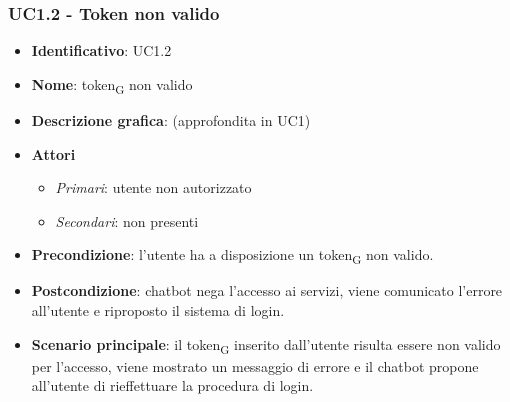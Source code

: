 \subsubsection{UC1.2 - Token non valido}
\begin{itemize}
    \item \textbf{Identificativo}: UC1.2
    \item \textbf{Nome}: token\textsubscript{G} non valido
    \item \textbf{Descrizione grafica}: (approfondita in UC1)
    \item \textbf{Attori}
 \begin{itemize} 
    \item \textit{Primari}: utente non autorizzato 
    \item \textit{Secondari}: non presenti
 \end{itemize}
 \item \textbf{Precondizione}: l'utente ha a disposizione un token\textsubscript{G} non valido.
 \item \textbf{Postcondizione}: chatbot nega l'accesso ai servizi, viene comunicato l'errore all'utente e riproposto il sistema di login.
 \item \textbf{Scenario principale}: il token\textsubscript{G} inserito dall'utente risulta essere non valido per l'accesso, viene mostrato un messaggio di errore e il chatbot propone all'utente di rieffettuare la procedura di login.
\end{itemize}
\newpage